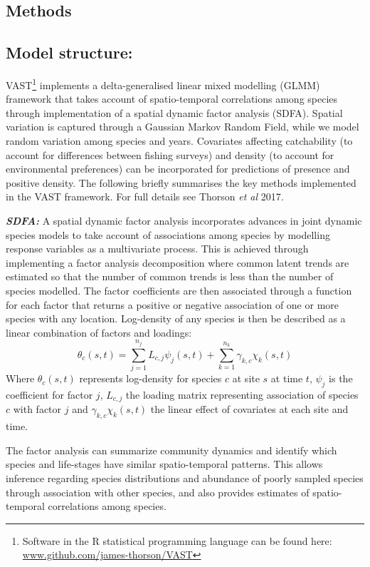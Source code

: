 \documentclass{nature}
\begin{document}
\begin{linenumbers}
\section*{Methods}

\subsection{Model structure:} 

VAST\footnote{Software in the R statistical programming language can be found
	here: \url{www.github.com/james-thorson/VAST}} implements a
delta-generalised linear mixed modelling (GLMM) framework that takes account of
spatio-temporal correlations among species through implementation of a
spatial dynamic factor analysis (SDFA). Spatial variation is captured through a
Gaussian Markov Random Field, while we model random variation among
species and years. Covariates affecting catchability (to account for
differences between fishing surveys) and density (to account for environmental
preferences) can be incorporated for predictions of presence and positive
density. The following briefly summarises the key methods implemented in the
VAST framework. For full details see 
Thorson \textit{et al} 2017\cite{Thorson2017}.

\textbf{\textit{SDFA:}} A spatial dynamic factor analysis incorporates advances
in joint dynamic species models\cite{Thorson2017} to take account of
associations among species by modelling response variables as a
multivariate process. This is achieved through implementing a factor analysis
decomposition where common latent trends are estimated so that the number of
common trends is less than the number of species modelled. The factor
coefficients are then associated through a function for each factor that
returns a positive or negative association of one or more species with any
location. Log-density of any species is then be described as a linear
combination of factors and loadings:
	\begin{equation}
		\theta_{c}(s,t) = \sum_{j=1}^{n_{j}}
		L_{c,j}\psi_{j}(s,t) +\sum_{k=1}^{n_{k}}
		\gamma_{k,c}\chi_{k}(s,t)
	\end{equation}
Where $\theta_{c}(s,t)$ represents log-density for species $c$ at site $s$ at
time $t$, $\psi_{j}$ is the coefficient for factor $j$, $L_{c,j}$ the loading
matrix representing association of species $c$ with factor $j$ and
$\gamma_{k,c}\chi_{k}(s,t)$ the linear effect of covariates at each site and
time\cite{Thorson2016b}. 

The factor analysis can summarize community dynamics and identify which species
and life-stages have similar spatio-temporal patterns. This allows inference
regarding species distributions and abundance of poorly sampled species through
association with other species, and also provides estimates of spatio-temporal
correlations among species\cite{Thorson2016b}.


\end{linenumbers}
\end{document}
